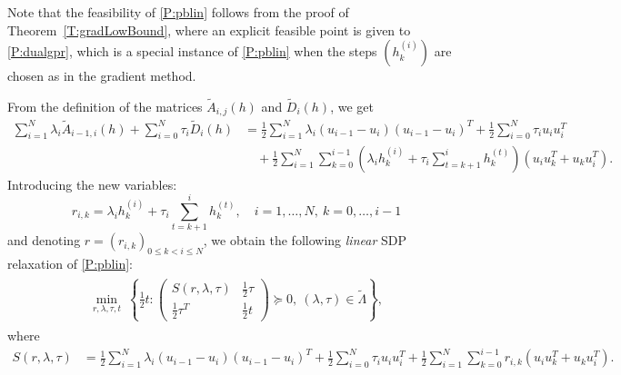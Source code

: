 \documentclass[12pt]{article}
\numberwithin{equation}{section}
\theoremstyle{definition}
\theoremstyle{remark}
\begin{document}
Note that
the feasibility of \eqref{P:pblin} follows from
the proof of Theorem~\ref{T:gradLowBound}, where an explicit feasible point is given to \eqref{P:dualgpr},
which is a special instance of \eqref{P:pblin} when the steps $(h^{(i)}_k)$ are chosen as in the gradient method.

From the definition of the matrices $\tilde{A}_{i,j}(h)$ and $\tilde{D}_i(h)$, we get
\begin{align*}
    \sum_{i=1}^N \lambda_i  \tilde{A}_{i-1,i}(h)  + \sum_{i=0}^N \tau_i  \tilde{D}_i(h)
    &= \frac{1}{2}\sum_{i=1}^{N} \lambda_i (u_{i-1}-u_i)(u_{i-1}-u_i)^T +\frac{1}{2}\sum_{i=0}^{N}
    \tau_i u_i u_i^T  \\&\quad+  \frac{1}{2}\sum_{i=1}^{N} \sum_{k=0}^{i-1}
    \left( \lambda_i h_k^{(i)}+\tau_i \sum_{t=k+1}^{i} h_k^{(t)}\right) (u_i u_k^T + u_k
    u_i^T).
\end{align*}
Introducing the new variables:
\begin{equation}\label{E:definex}
    r_{i,k}=  \lambda_i h_k^{(i)}+\tau_i \sum_{t=k+1}^{i} h_k^{(t)}, \quad i=1,\dots,N,\ k=0,\dots,i-1
\end{equation}
and denoting $r=(r_{i,k})_{0\leq k<i \leq N}$, we obtain the following \emph{linear} SDP
relaxation of \eqref{P:pblin}:
\begin{align*}
    \begin{aligned}
    \min_{r,\lambda, \tau,t}\ \left\{ \frac{1}{2} t :
            \begin{pmatrix}
                S(r,\lambda,\tau)  &\frac{1}{2} \tau \\
                \frac{1}{2} \tau^T      & \frac{1}{2} t
        \end{pmatrix} \succeq 0, \
        (\lambda, \tau) \in \tilde{\Lambda} \right\},
    \end{aligned}
    \tag{LIN}\label{P:plin}
\end{align*}
where
\begin{align*}
     S(r,\lambda,\tau)
    &= \frac{1}{2}\sum_{i=1}^{N} \lambda_i (u_{i-1}-u_i)(u_{i-1}-u_i)^T +\frac{1}{2}\sum_{i=0}^{N} \tau_i u_i u_i^T  +  \frac{1}{2}\sum_{i=1}^{N} \sum_{k=0}^{i-1} r_{i,k} (u_i u_k^T + u_k u_i^T).
\end{align*}
\end{document}
